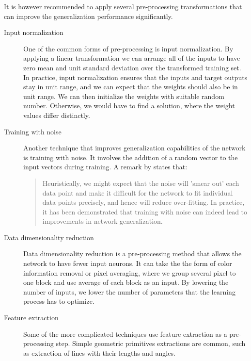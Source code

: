 It is however recommended to apply several pre-processing transformations that can improve the generalization performance significantly.
\begin{description}
\item [Input normalization]
One of the common forms of pre-processing is input normalization. By applying a linear transformation we can arrange all of the inputs to have zero mean and unit standard deviation over the transformed training set.
In practice, input normalization ensures that the inputs and target outputs stay in unit range, and we can expect that the weights should also be in unit range. We can then initialize the weights with suitable random number. Otherwise, we would have to find a solution, where the weight values differ distinctly.
\item [Training with noise]
Another technique that improves generalization capabilities of the network is training with noise. It involves the addition of a random vector to the input vectors during training. A remark by \citet{bishop} states that: 
\begin{quotation} Heuristically, we might expect that the noise will 'smear out' each data point
and make it difficult for the network to fit individual data points precisely, and
hence will reduce over-fitting. In practice, it has been demonstrated that training
with noise can indeed lead to improvements in network generalization. 
\end{quotation}
\item [Data dimensionality reduction]
Data dimensionality reduction is a pre-processing method that allows the network to have fewer input neurons. It can take the the form of color information removal or pixel averaging, where we group several pixel to one block and use average of each block as an input. By lowering the number of inputs, we lower the number of parameters that the learning process has to optimize.
\item [Feature extraction]
Some of the more complicated techniques use feature extraction as a pre-processing step. Simple geometric primitives extractions are common, such as extraction of lines with their lengths and angles.
\end{description}
